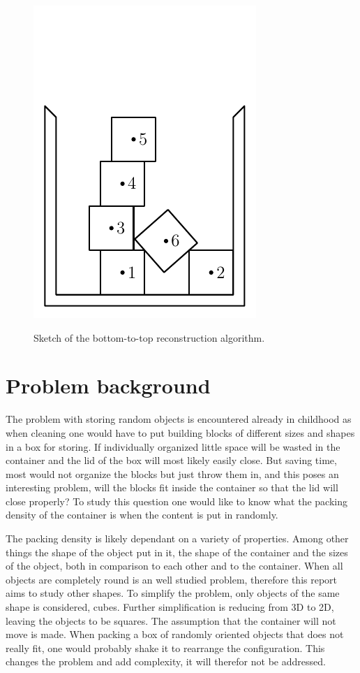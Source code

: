 \documentclass[12pt, sumlimits, intlimits]{article}
\begin{document}
\begin{figure}
\includegraphics[width=\w]{btr-11} \\
\caption{Sketch of the bottom-to-top reconstruction algorithm.}
\label{f/btr}
\end{figure}

\section{Problem background}
The problem with storing random objects is encountered already in childhood as when cleaning one would have to put building blocks of different sizes and shapes in a box for storing. If individually organized little space will be wasted in the container and the lid of the box will most likely easily close. But saving time, most would not organize the blocks but just throw them in, and this poses an interesting problem, will the blocks fit inside the container so that the lid will close properly?
To study this question one would like to know what the packing density of the container is when the content is put in randomly.

The packing density is likely dependant on a variety of properties. Among other things the shape of the object put in it, the shape of the container and the sizes of the object, both in comparison to each other and to the container. When all objects are completely round is an well studied problem, therefore this report aims to study other shapes.
To simplify the problem, only objects of the same shape is considered, cubes. Further simplification is reducing from 3D to 2D, leaving the objects to be squares.
The assumption that the container will not move is made. When packing a box of randomly oriented objects that does not really fit, one would probably shake it to rearrange the configuration. This changes the problem and add complexity, it will therefor not be addressed.
\end{document}
